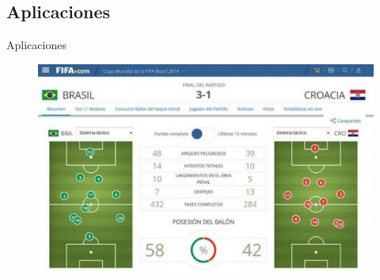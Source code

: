 \documentclass[]{beamer}
\begin{document}
\subsection{Aplicaciones}
\begin{frame}{Aplicaciones} %


    \begin{figure}[t]
        \centering
        \includegraphics[scale=0.5]{img/estadistica.jpg}
    \end{figure}
\end{frame}
\end{document}
